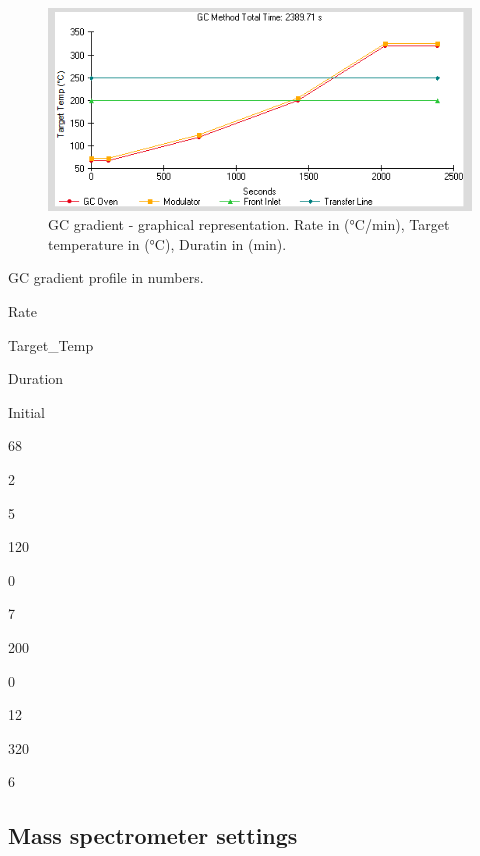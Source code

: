 \documentclass[]{book}
\theoremstyle{definition}
\theoremstyle{definition}
\theoremstyle{definition}
\theoremstyle{remark}
\begin{document}
\begin{figure}
\centering
\includegraphics{images/gradient.PNG}
\caption{\label{fig:gradient}GC gradient - graphical representation. Rate in
(°C/min), Target temperature in (°C), Duratin in (min).}
\end{figure}

\label{tab:gradient2}GC gradient profile in numbers.

Rate

Target\_Temp

Duration

Initial

68

2

5

120

0

7

200

0

12

320

6

\subsection{Mass spectrometer
settings}\label{mass-spectrometer-settings}


\end{document}
